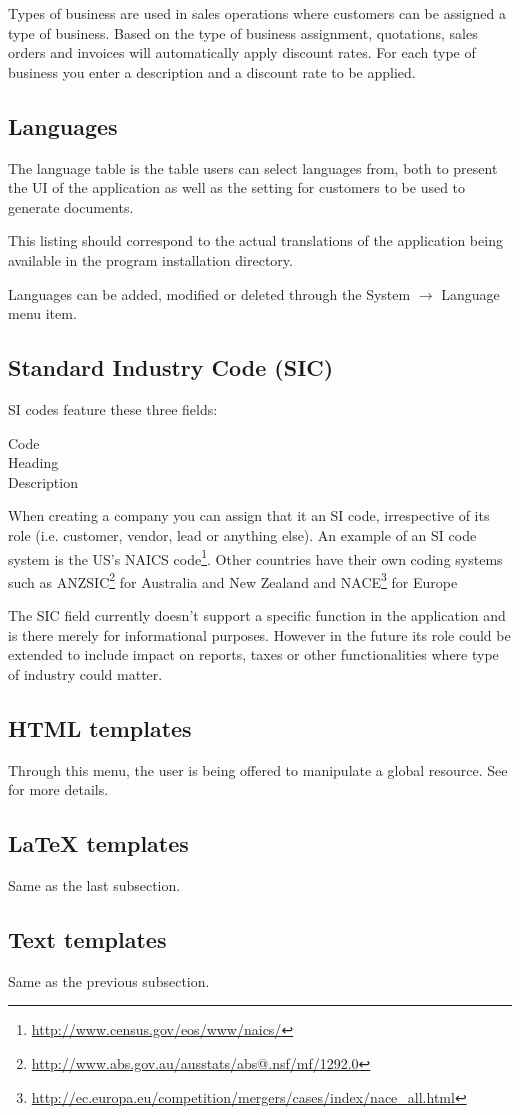Types of business are used in sales operations where customers can be assigned a type
of business. Based on the type of business assignment, quotations, sales orders and
invoices will automatically apply discount rates. For each type of business you enter a description and a discount rate to be applied.

\subsection{Languages}

The language table is the table users can select languages from, both to present
the UI of the application as well as the setting for customers to be used to generate
documents.

This listing should correspond to the actual translations of the application being
available in the program installation directory.

Languages can be added, modified or deleted through the System $\rightarrow$ Language menu item.

\subsection{Standard Industry Code (SIC)}

SI codes feature these three fields:

\begin{description}
\item [Code]
\item [Heading]
\item [Description]
\end{description}

When creating a company you can assign that it an SI code, irrespective of its role (i.e. customer,
vendor, lead or anything else). An example of an SI code system is the
US's NAICS code\footnote{\url{http://www.census.gov/eos/www/naics/}}.
Other countries have their own coding systems such
as ANZSIC\footnote{\url{http://www.abs.gov.au/ausstats/abs@.nsf/mf/1292.0}} for Australia and New Zealand
and NACE\footnote{\url{http://ec.europa.eu/competition/mergers/cases/index/nace\_all.html}} for Europe

The SIC field currently doesn't support a specific function in the application and is there
merely for informational purposes. However in the future its role could be extended to include
impact on reports, taxes or other functionalities where type of industry could matter.

\subsection{HTML templates}

Through this menu, the user is being offered to manipulate a global resource. See
 for more details.

\subsection{LaTeX templates}

Same as the last subsection.

\subsection{Text templates}

Same as the previous subsection.


